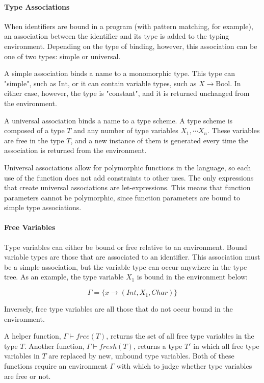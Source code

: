 \documentclass[class=article, crop=false]{standalone}
\begin{document}
\paragraph{Type Associations}

When identifiers are bound in a program (with pattern matching, for example), an association between the identifier and its type is added to the typing environment.
Depending on the type of binding, however, this association can be one of two types: simple or universal.

A simple association binds a name to a monomorphic type.
This type can "simple", such as $\text{Int}$, or it can contain variable types, such as $X \rightarrow \text{Bool}$.
In either case, however, the type is "constant", and it is returned unchanged from the environment.

A universal association binds a name to a type scheme.
A type scheme is composed of a type $T$ and any number of type variables $X_1, \cdots X_n$.
These variables are free in the type $T$, and a new instance of them is generated every time the association is returned from the environment.

Universal associations allow for polymorphic functions in the language, so each use of the function does not add constraints to other uses.
The only expressions that create universal associations are let-expressions.
This means that function parameters cannot be polymorphic, since function parameters are bound to simple type associations.

\paragraph{Free Variables}

Type variables can either be bound or free relative to an environment.
Bound variable types are those that are associated to an identifier.
This association must be a simple association, but the variable type can occur anywhere in the type tree.
As an example, the type variable $X_1$ is bound in the environment below:

$$\Gamma = \{x \rightarrow (Int, X_1, Char)\}$$

Inversely, free type variables are all those that do not occur bound in the environment.

\medskip

A helper function, $\Gamma \vdash free(T)$, returns the set of all free type variables in the type $T$.
Another function, $\Gamma \vdash fresh(T)$, returns a type $T'$ in which all free type variables in $T$ are replaced by new, unbound type variables.
Both of these functions require an environment $\Gamma$ with which to judge whether type variables are free or not.
\end{document}
